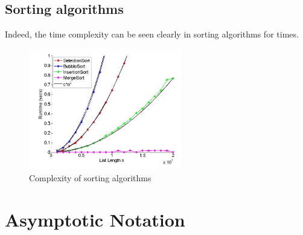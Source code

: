 \documentclass[a4paper]{article}
\theoremstyle{plain}
\theoremstyle{definition}
\theoremstyle{remark}
\begin{document}
\subsection{Sorting algorithms}
Indeed, the time complexity can be seen clearly in sorting algorithms for times.
\begin{figure}[H]
	\centering
	\includegraphics[width=0.6\textwidth]{sorting.png}
	\caption{Complexity of sorting algorithms}
	\label{fig:sorting-png}
\end{figure}
\section{Asymptotic Notation}
\end{document}
